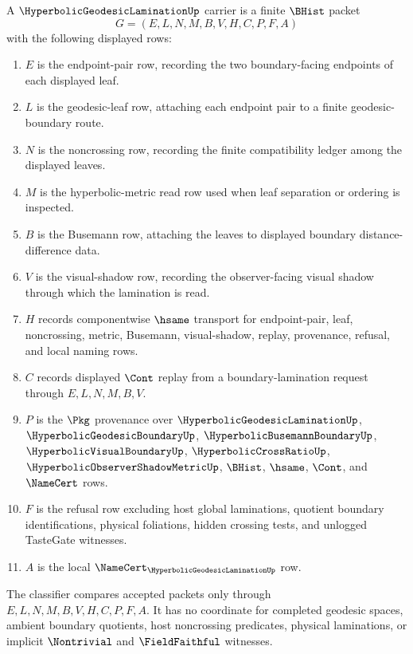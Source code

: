 \begin{definition}
\label{def:hyperbolic-geodesic-lamination-carrier}
A $\HyperbolicGeodesicLaminationUp$ carrier is a finite $\BHist$ packet
$$
G=(E,L,N,M,B,V,H,C,P,F,A)
$$
with the following displayed rows:
\begin{enumerate}
\item $E$ is the endpoint-pair row, recording the two boundary-facing endpoints of each displayed leaf.
\item $L$ is the geodesic-leaf row, attaching each endpoint pair to a finite geodesic-boundary route.
\item $N$ is the noncrossing row, recording the finite compatibility ledger among the displayed leaves.
\item $M$ is the hyperbolic-metric read row used when leaf separation or ordering is inspected.
\item $B$ is the Busemann row, attaching the leaves to displayed boundary distance-difference data.
\item $V$ is the visual-shadow row, recording the observer-facing visual shadow through which the lamination is read.
\item $H$ records componentwise $\hsame$ transport for endpoint-pair, leaf, noncrossing, metric, Busemann, visual-shadow, replay, provenance, refusal, and local naming rows.
\item $C$ records displayed $\Cont$ replay from a boundary-lamination request through $E,L,N,M,B,V$.
\item $P$ is the $\Pkg$ provenance over $\HyperbolicGeodesicLaminationUp$, $\HyperbolicGeodesicBoundaryUp$, $\HyperbolicBusemannBoundaryUp$, $\HyperbolicVisualBoundaryUp$, $\HyperbolicCrossRatioUp$, $\HyperbolicObserverShadowMetricUp$, $\BHist$, $\hsame$, $\Cont$, and $\NameCert$ rows.
\item $F$ is the refusal row excluding host global laminations, quotient boundary identifications, physical foliations, hidden crossing tests, and unlogged TasteGate witnesses.
\item $A$ is the local $\NameCert_{\HyperbolicGeodesicLaminationUp}$ row.
\end{enumerate}
The classifier compares accepted packets only through $E,L,N,M,B,V,H,C,P,F,A$. It has no coordinate for completed geodesic spaces, ambient boundary quotients, host noncrossing predicates, physical laminations, or implicit $\Nontrivial$ and $\FieldFaithful$ witnesses.
\end{definition}

